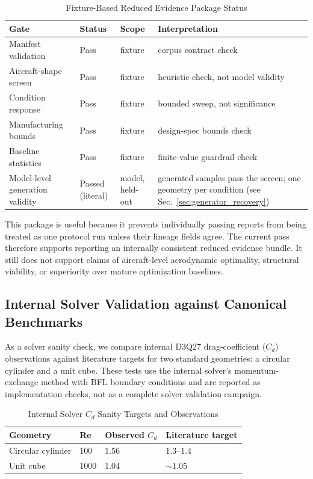 \begin{table}[!t]
\centering
\caption{Fixture-Based Reduced Evidence Package Status}
\label{tab:final_evidence_package}
\footnotesize
\setlength{\tabcolsep}{2pt}
\begin{tabular}{|p{}|p{}|p{}|p{}|}
\hline
\textbf{Gate} & \textbf{Status} & \textbf{Scope} & \textbf{Interpretation} \\ \hline
Manifest validation & Pass & fixture & corpus contract check \\ \hline
Aircraft-shape screen & Pass & fixture & heuristic check, not model validity \\ \hline
Condition response & Pass & fixture & bounded sweep, not significance \\ \hline
Manufacturing bounds & Pass & fixture & design-spec bounds check \\ \hline
Baseline statistics & Pass & fixture & finite-value guardrail check \\ \hline
Model-level generation validity & Passed (literal) & model, held-out & generated samples pass the screen; one geometry per condition (see Sec.~\ref{sec:generator_recovery}) \\ \hline
\end{tabular}
\end{table}

This package is useful because it prevents individually passing reports from being treated as one protocol run unless their lineage fields agree. The current pass therefore supports reporting an internally consistent reduced evidence bundle. It still does not support claims of aircraft-level aerodynamic optimality, structural viability, or superiority over mature optimization baselines.

\subsection{Internal Solver Validation against Canonical Benchmarks}
As a solver sanity check, we compare internal D3Q27 drag-coefficient ($C_d$) observations against literature targets for two standard geometries: a circular cylinder and a unit cube. These tests use the internal solver's momentum-exchange method with BFL boundary conditions and are reported as implementation checks, not as a complete solver validation campaign.

\begin{table}[!t]
\centering
\caption{Internal Solver $C_d$ Sanity Targets and Observations}
\label{tab:cd_validation}
\footnotesize
\setlength{\tabcolsep}{2pt}
\begin{tabular}{|p{}|p{}|p{}|p{}|}
\hline
\textbf{Geometry} & \textbf{Re} & \textbf{Observed $C_d$} & \textbf{Literature target} \\ \hline
Circular cylinder & 100 & 1.56 & 1.3--1.4 \cite{schafer1996benchmark} \\ \hline
Unit cube & 1000 & 1.04 & $\sim$1.05 \cite{geier2015cascaded} \\ \hline
\end{tabular}
\end{table}

